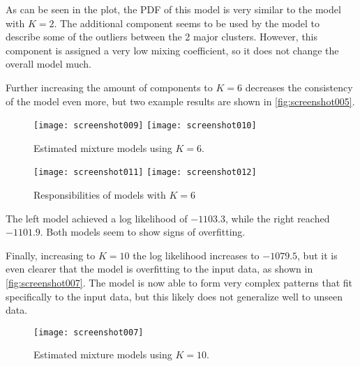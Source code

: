 \documentclass[a4paper, 12pt]{article}
\begin{document}
As can be seen in the plot, the PDF of this model is very similar to the model with $K=2$. The additional component seems to be used by the model to describe some of the outliers between the 2 major clusters. However, this component is assigned a very low mixing coefficient, so it does not change the overall model much.

Further increasing the amount of components to $K=6$ decreases the consistency of the model even more, but two example results are shown in \autoref{fig:screenshot005}.

\begin{figure}[H]
	\centering
	\texttt{[image: screenshot009]}
	\texttt{[image: screenshot010]}
	\caption{Estimated mixture models using $K=6$.}
	\label{fig:screenshot005}
\end{figure}

\begin{figure}[H]
	\centering
	\texttt{[image: screenshot011]}
	\texttt{[image: screenshot012]}
	\caption{Responsibilities of models with $K=6$}
	\label{fig:screenshot008}
\end{figure}


The left model achieved a log likelihood of $-1103.3$, while the right reached $-1101.9$. Both models seem to show signs of overfitting.

Finally, increasing to $K=10$ the log likelihood increases to $-1079.5$, but it is even clearer that the model is overfitting to the input data, as shown in \autoref{fig:screenshot007}. The model is now able to form very complex patterns that fit specifically to the input data, but this likely does not generalize well to unseen data.

\begin{figure}[H]
	\centering
	\texttt{[image: screenshot007]}
	\caption{Estimated mixture models using $K=10$.}
	\label{fig:screenshot007}
\end{figure}
\end{document}
